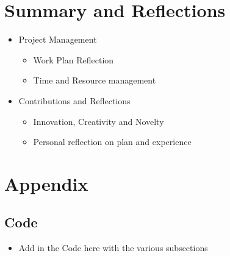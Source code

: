 \documentclass[a4paper]{article}
\begin{document}
\section{Summary and Reflections}
\begin{itemize}
	\item Project Management \begin{itemize}
		\item Work Plan Reflection
		\item Time and Resource management
	\end{itemize}
	\item Contributions and Reflections \begin{itemize}
		\item Innovation, Creativity and Novelty
		\item Personal reflection on plan and experience
	\end{itemize}
\end{itemize}

\pagebreak
\section{Appendix}
\subsection{Code} %
\begin{itemize}
	\item Add in the Code here with the various subsections
\end{itemize}
\end{document}
